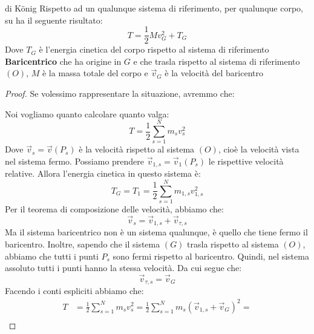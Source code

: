 \documentclass[11pt,a4paper,twoside]{article}
\theoremstyle{definition}
\begin{document}
\begin{thm}{di König}{}\label{Konig}
	Rispetto ad un qualunque sistema di riferimento, per qualunque corpo, su ha il seguente risultato:
	\[ T = \frac 12 Mv_G^2 + T_G \]
	Dove $T_G$ è l'energia cinetica del corpo rispetto al sistema di riferimento \textbf{Baricentrico} che ha origine in $G$ e che trasla rispetto al sistema di riferimento $(O)$, $M$ è la massa totale del corpo e $\vec v_G$ è la velocità del baricentro
\end{thm}
\begin{proof}
	Se volessimo rappresentare la situazione, avremmo che:
	\begin{center}
	\end{center}
	Noi vogliamo quanto calcolare quanto valga:
	\[ T = \frac 12 \sum_{s = 1}^N m_s v_s^2 \]
	Dove $\vec v_s = \vec v(P_s)$ è la velocità rispetto al sistema $(O)$, cioè la velocità vista nel sistema fermo. Possiamo prendere $\vec v_{1,s} = \vec v_1(P_s)$ le rispettive velocità relative. Allora l'energia cinetica in questo sistema è:
	\[ T_G = T_1 = \frac 12 \sum_{s = 1}^N m_{1,s} v_{1,s}^2\]
	Per il teorema di composizione delle velocità, abbiamo che:
	\[ \vec v_s = \vec v_{1,s} + \vec v_{\tau, s}\]
	Ma il sistema baricentrico non è un sistema qualunque, è quello che tiene fermo il baricentro. Inoltre, sapendo che il sistema $(G)$ trasla rispetto al sistema $(O)$, abbiamo che tutti i punti $P_s$ sono fermi rispetto al baricentro. Quindi, nel sistema assoluto tutti i punti hanno la stessa velocità. Da cui segue che:
	\[ \vec v_{\tau,s} = \vec v_G\]
	Facendo i conti espliciti abbiamo che:
	\begin{align*}
		T &= \frac 12 \sum_{s =1}^N m_s v_s^2 = \frac 12 \sum_{s =1}^N m_s(\vec v_{1,s} + \vec v_G)^2= \\

\end{align*}
\end{proof}
\end{document}
